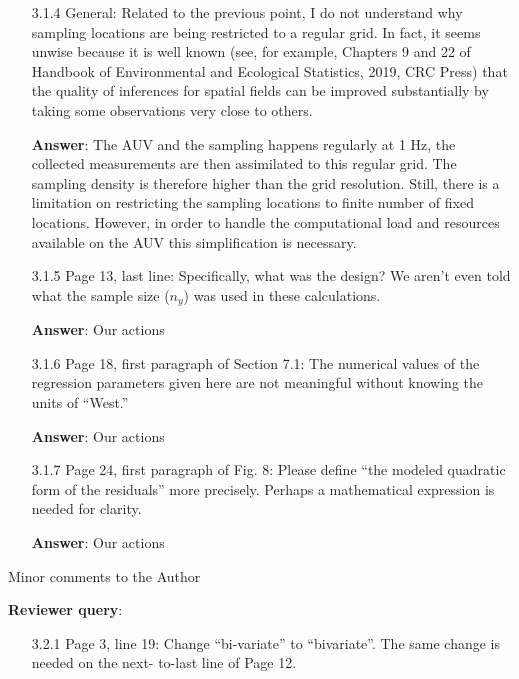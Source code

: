 \documentclass[a4paper]{article}
\def\reply{\textbf{Reviewer query}}
\def\action{\textbf{Answer}}
\begin{document}
\begin{answers}
\begin{itemize}[noitemsep,topsep=0pt,parsep=0pt,partopsep=0pt]
\item[3.1.4] General: Related to the previous point, I do not understand why sampling locations are being restricted to a regular grid. In fact, it seems unwise because it is well known (see, for example, Chapters 9 and 22 of Handbook of Environmental and Ecological Statistics, 2019, CRC Press)
that the quality of inferences for spatial fields can be improved substantially by taking some
observations very close to others.\par
\action: The AUV and the sampling happens regularly at 1 Hz, the collected measurements are then assimilated to this regular grid. The sampling density is therefore higher than the grid resolution. Still, there is a limitation on restricting the sampling locations to finite number of fixed locations. However, in order to handle the computational load and resources available on the AUV this simplification is necessary. %
\vspace{1em}

\item[3.1.5] Page 13, last line: Specifically, what was the design? We aren’t even told what the sample size ($n_y$) was used in these calculations.\par
\action: Our actions
\vspace{1em}

\item[3.1.6] Page 18, first paragraph of Section 7.1: The numerical values of the regression parameters given here are not meaningful without knowing the units of “West.”\par
\action: Our actions
\vspace{1em}

\item[3.1.7] Page 24, first paragraph of Fig. 8: Please define “the modeled quadratic form of the residuals” more precisely. Perhaps a mathematical expression is needed for clarity.\par
\action: Our actions
\vspace{1em}

\end{itemize}


\item{Minor comments to the Author}\label{q31}

\reply: 
\begin{itemize}[noitemsep,topsep=0pt,parsep=0pt,partopsep=0pt]

\item[3.2.1] Page 3, line 19: Change “bi-variate” to “bivariate”. The same change is needed on the next-
to-last line of Page 12.


\end{itemize}
\end{answers}
\end{document}
